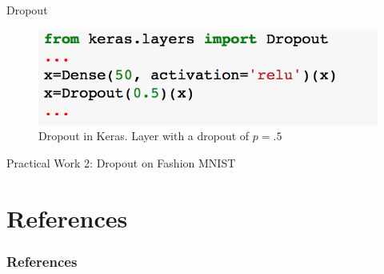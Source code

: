 \documentclass[handout,xcolor=pdftex,dvipsnames,table,mathserif]{beamer}
\begin{document}
\begin{frame}{Dropout}
\begin{figure}
\includegraphics[width=.99 \columnwidth]{../graphics/DropoutKeras}
\caption{Dropout in Keras. Layer with a dropout of $p=.5$}
\end{figure}
Practical Work 2:  Dropout on Fashion MNIST
\end{frame}
	


\section{References}
\begin{frame}[allowframebreaks]
	\frametitle{References}
	
\end{frame}
\end{document}
